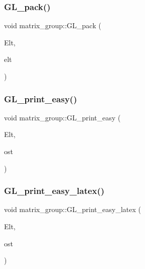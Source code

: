 \mbox{\label{classmatrix__group_a5701f20e9b4a253ef8299c8122f8d926}} 
\subsubsection{\texorpdfstring{G\+L\+\_\+pack()}{GL\_pack()}}
{\footnotesize\ttfamily void matrix\+\_\+group\+::\+G\+L\+\_\+pack (\begin{DoxyParamCaption}\item[{\mbox{\hyperlink{galois_8h_a09fddde158a3a20bd2dcadb609de11dc}{I\+NT}} $\ast$}]{Elt,  }\item[{\mbox{\hyperlink{galois_8h_a122c4acf389c050379f00341fdcd5812}{U\+B\+Y\+TE}} $\ast$}]{elt }\end{DoxyParamCaption})}

\mbox{\label{classmatrix__group_a3e6f5c276210e8132523150fad82c57e}} 
\subsubsection{\texorpdfstring{G\+L\+\_\+print\+\_\+easy()}{GL\_print\_easy()}}
{\footnotesize\ttfamily void matrix\+\_\+group\+::\+G\+L\+\_\+print\+\_\+easy (\begin{DoxyParamCaption}\item[{\mbox{\hyperlink{galois_8h_a09fddde158a3a20bd2dcadb609de11dc}{I\+NT}} $\ast$}]{Elt,  }\item[{ostream \&}]{ost }\end{DoxyParamCaption})}

\mbox{\label{classmatrix__group_a45a042521f1f125b241c78c1388b078c}} 
\subsubsection{\texorpdfstring{G\+L\+\_\+print\+\_\+easy\+\_\+latex()}{GL\_print\_easy\_latex()}}
{\footnotesize\ttfamily void matrix\+\_\+group\+::\+G\+L\+\_\+print\+\_\+easy\+\_\+latex (\begin{DoxyParamCaption}\item[{\mbox{\hyperlink{galois_8h_a09fddde158a3a20bd2dcadb609de11dc}{I\+NT}} $\ast$}]{Elt,  }\item[{ostream \&}]{ost }\end{DoxyParamCaption})}

